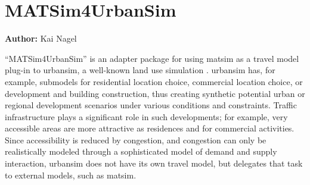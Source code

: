 \chapter{MATSim4UrbanSim}
\label{sec:matsim4urbansim}

\hfill \textbf{Author:} Kai Nagel





``MATSim4UrbanSim'' is an adapter package for using \gls{matsim} as a travel model plug-in to \gls{urbansim}, a well-known land use simulation \citep[e.g.][see \url{http://www.urbansim.org}]{WaddellEtc2003UrbanSim}.
\gls{urbansim} has, for example, submodels for residential location choice, commercial location choice, or development and building construction, thus creating synthetic  potential urban or regional development scenarios under various conditions and constraints. 
Traffic infrastructure plays a significant role in such developments; for example, very accessible areas are more attractive as residences and for commercial activities. 
Since accessibility is reduced by congestion, and congestion can only be realistically modeled through a sophisticated model of demand and supply interaction, \gls{urbansim} does not have its own travel model, but delegates that task to external models, such as \gls{matsim}.


